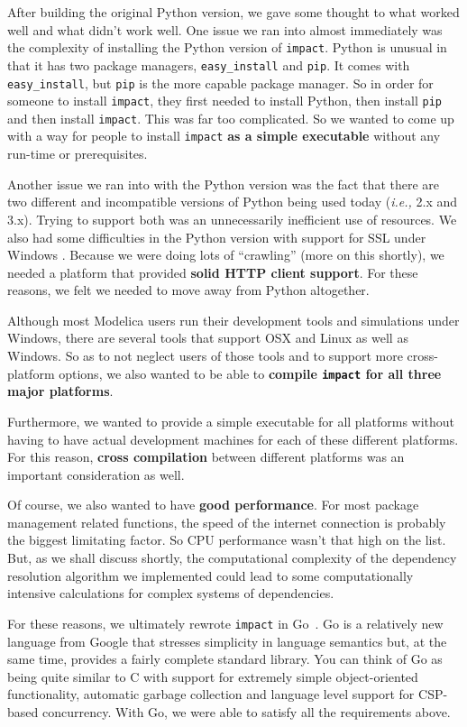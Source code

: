 \documentclass[11pt,a4paper,twocolumn]{article}
\newcommand{\code}[1]{\texttt{#1}} %
\begin{document}
After building the original Python version, we gave some thought to
what worked well and what didn't work well.  One issue we ran into
almost immediately was the complexity of installing the Python version
of \code{impact}.  Python is unusual in that it has two package
managers, \code{easy\_install} and \code{pip}.  It comes with
\code{easy\_install}, but \code{pip} is the more capable package
manager.  So in order for someone to install \code{impact}, they first
needed to install Python, then install \code{pip} and then install
\code{impact}.  This was far too complicated.  So we wanted to come up
with a way for people to install \code{impact} \textbf{as a simple
  executable} without any run-time or prerequisites.

Another issue we ran into with the Python version was the fact that
there are two different and incompatible versions of Python being used
today (\emph{i.e.,} 2.x and 3.x).  Trying to support both was an
unnecessarily inefficient use of resources.  We also had some
difficulties in the Python version with support for SSL under Windows
\parencite{python-ssl}.  Because we were doing lots of ``crawling''
(more on this shortly), we needed a platform that provided
\textbf{solid HTTP client support}.  For these reasons, we felt we
needed to move away from Python altogether.

Although most Modelica users run their development tools and
simulations under Windows, there are several tools that support OSX
and Linux as well as Windows.  So as to not neglect users of those
tools and to support more cross-platform options, we also wanted to be
able to \textbf{compile \code{impact} for all three major platforms}.

Furthermore, we wanted to provide a simple executable for all
platforms without having to have actual development machines for each
of these different platforms.  For this reason, \textbf{cross
  compilation} between different platforms was an important
consideration as well.

Of course, we also wanted to have \textbf{good performance}.  For most
package management related functions, the speed of the internet
connection is probably the biggest limitating factor.  So CPU
performance wasn't that high on the list.  But, as we shall discuss
shortly, the computational complexity of the dependency resolution
algorithm we implemented could lead to some computationally intensive
calculations for complex systems of dependencies.

For these reasons, we ultimately rewrote \code{impact} in
Go~\parencite{go-lang}.  Go is a relatively new language from Google
that stresses simplicity in language semantics but, at the same time,
provides a fairly complete standard library.  You can think of Go as
being quite similar to C with support for extremely simple
object-oriented functionality, automatic garbage collection and
language level support for CSP-based concurrency.  With Go, we were
able to satisfy all the requirements above.
\end{document}
